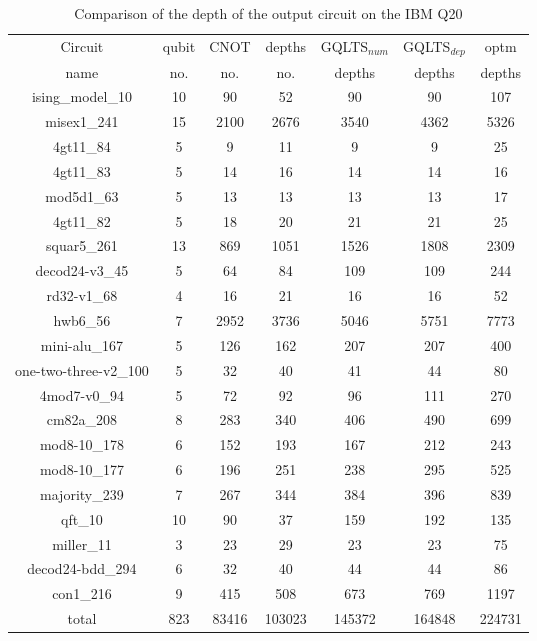 \documentclass[runningheads]{llncs}
\begin{document}
							\begin{table}[H]
								\label{tab8}
								\begin{center}  
								\begin{tabular}{|c|c|c|c|c|c|c|}
								\hline
								Circuit &  qubit  & CNOT &depths &GQLTS$_{num}$& GQLTS$_{dep}$  & optm 	  	\\
								 name	&   no. 	&	no. & no. & depths&  depths &  depths 	\\
								\hline
								ising\_model\_10 & 10 & 90 & 52 & 90 & 90 & 107 \\
								misex1\_241 & 15 & 2100 & 2676 & 3540 & 4362 & 5326 \\
								4gt11\_84 & 5 & 9 & 11 & 9 & 9 & 25 \\
								4gt11\_83 & 5 & 14 & 16 & 14 & 14 & 16 \\
								mod5d1\_63 & 5 & 13 & 13 & 13 & 13 & 17 \\
								4gt11\_82 & 5 & 18 & 20 & 21 & 21 & 25 \\
								squar5\_261 & 13 & 869 & 1051 & 1526 & 1808 & 2309 \\
								decod24-v3\_45 & 5 & 64 & 84 & 109 & 109 & 244 \\
								rd32-v1\_68 & 4 & 16 & 21 & 16 & 16 & 52 \\
								hwb6\_56 & 7 & 2952 & 3736 & 5046 & 5751 & 7773 \\
								mini-alu\_167 & 5 & 126 & 162 & 207 & 207 & 400 \\
								one-two-three-v2\_100 & 5 & 32 & 40 & 41 & 44 & 80 \\
								4mod7-v0\_94 & 5 & 72 & 92 & 96 & 111 & 270 \\
								cm82a\_208 & 8 & 283 & 340 & 406 & 490 & 699 \\
								mod8-10\_178 & 6 & 152 & 193 & 167 & 212 & 243 \\
								mod8-10\_177 & 6 & 196 & 251 & 238 & 295 & 525 \\
								majority\_239 & 7 & 267 & 344 & 384 & 396 & 839 \\
								qft\_10 & 10 & 90 & 37 & 159 & 192 & 135 \\
								miller\_11 & 3 & 23 & 29 & 23 & 23 & 75 \\
								decod24-bdd\_294 & 6 & 32 & 40 & 44 & 44 & 86 \\
								con1\_216 & 9 & 415 & 508 & 673 & 769 & 1197 \\
								\hline
								total & 823 & 83416 & 103023 & 145372 & 164848 & 224731  \\ 
							\hline
								\end{tabular} 
								\end{center}						
								\caption{Comparison of  the depth of the output circuit on the IBM Q20} 
								\label{tab8}\end{table}
\end{document}
